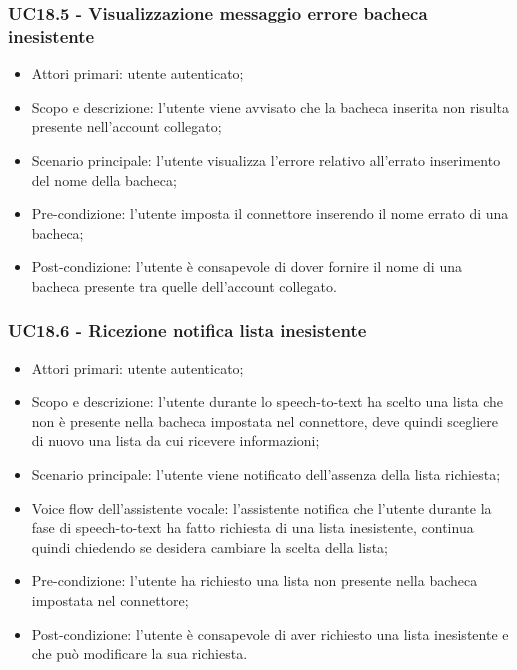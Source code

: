 \subsubsection{UC18.5 - Visualizzazione messaggio errore bacheca inesistente}
\begin{itemize}
	\item  Attori primari: utente autenticato;
	\item  Scopo e descrizione: l'utente viene avvisato che la bacheca inserita non risulta presente nell'account collegato;
	\item  Scenario principale: l'utente visualizza l'errore relativo all'errato inserimento del nome della bacheca;
	\item  Pre-condizione: l'utente imposta il connettore inserendo il nome errato di una bacheca;
	\item  Post-condizione: l'utente è consapevole di dover fornire il nome di una bacheca presente tra quelle dell'account collegato.
\end{itemize}
\subsubsection{UC18.6 - Ricezione notifica lista inesistente}
\begin{itemize}
	\item  Attori primari: utente autenticato;
	\item  Scopo e descrizione: l'utente durante lo speech-to-text ha scelto una lista che non è presente nella bacheca impostata nel connettore, deve quindi scegliere di nuovo una lista da cui ricevere informazioni;
	\item  Scenario principale: l'utente viene notificato dell'assenza della lista richiesta;
	\item  Voice flow dell'assistente vocale: l'assistente notifica che l'utente durante la fase di speech-to-text ha fatto richiesta di una lista inesistente, continua quindi chiedendo se desidera cambiare la scelta della lista;
	\item  Pre-condizione: l'utente ha richiesto una lista non presente nella bacheca impostata nel connettore;
	\item  Post-condizione: l'utente è consapevole di aver richiesto una lista inesistente e che può modificare la sua richiesta.
\end{itemize}
